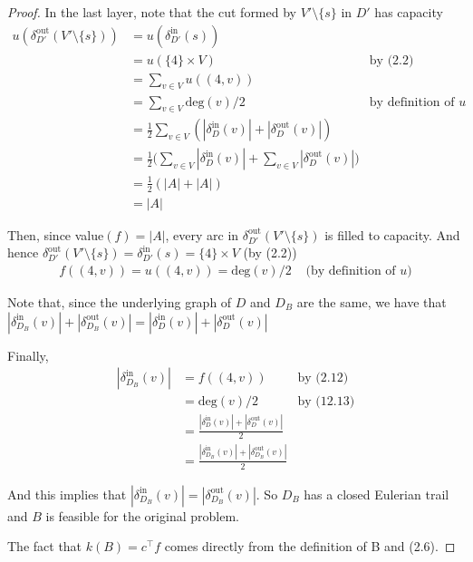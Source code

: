 \documentclass[a4paper,10pt, leqno]{article}
\theoremstyle{definition}
\begin{document}
\begin{proof}
In the last layer, note that the cut formed by $V' \setminus \{s\}$ in $D'$ has capacity 
\begin{align*}
u(\delta_{D'}^{\text{out}}(V' \setminus \{s\})) &= u(\delta_{D'}^{\text{in}}(s)) \\
&= u(\{4\} \times V) &\text{by (2.2)}\\
&= \sum_{v \in V}{u((4, v))} \\
&= \sum_{v \in V}{\text{deg}(v)/2} &\text{by definition of }u \\
&= \frac{1}{2}\sum_{v \in V}{(|\delta_D^\text{in}(v)| + |\delta_D^\text{out}(v)|)} \\
&= \frac{1}{2}(\sum_{v \in V}{|\delta_D^\text{in}(v)|} + \sum_{v \in V}{|\delta_D^\text{out}(v)|)} \\
&= \frac{1}{2}(|A| + |A|) \\
&= |A|
\end{align*}

Then, since value$(f) = |A|$, every arc in $\delta_{D'}^{\text{out}}(V' \setminus \{s\})$ is filled to capacity.
And hence $\delta_{D'}^{\text{out}}(V' \setminus \{s\}) = \delta_{D'}^{\text{in}}(s) = \{4\} \times V$ (by (2.2)) 
\begin{align*}
\tag{2.13}
 f((4, v)) = u((4, v)) = \text{deg}(v)/2 &\text{ (by definition of }u)
\end{align*}

Note that, since the underlying graph of $D$ and $D_B$ are the same, we have that $|\delta_{D_B}^\text{in}(v)| + |\delta_{D_B}^\text{out}(v)| =|\delta_{D}^\text{in}(v)| + |\delta_{D}^\text{out}(v)| $

Finally,
\begin{align*}
|\delta_{D_B}^\text{in}(v)| &= f((4, v)) &\text{by (2.12)} \\
&= \text{deg}(v)/2 &\text{by (12.13)} \\
&= \frac{|\delta_{D}^\text{in}(v)| + |\delta_{D}^\text{out}(v)|}{2} \\
&= \frac{|\delta_{D_B}^\text{in}(v)| + |\delta_{D_B}^\text{out}(v)|}{2}
\end{align*}

And this implies that $|\delta_{D_B}^\text{in}(v)| = |\delta_{D_B}^\text{out}(v)|$. So $D_B$ has a closed Eulerian trail and $B$ is feasible for the original problem.

The fact that $k(B) = c^\intercal f$ comes directly from the definition of B and (2.6).

\end{proof}
\end{document}
